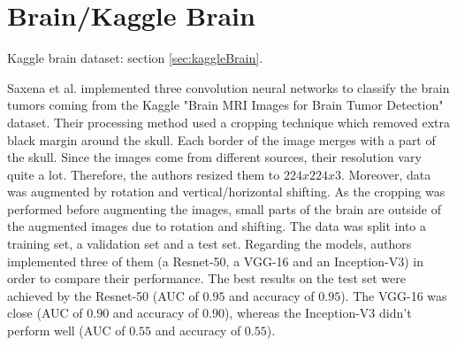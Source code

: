 \section{Brain/Kaggle Brain}
Kaggle brain dataset: section \ref{sec:kaggleBrain}.


Saxena et al. \cite{31} implemented three convolution neural networks to classify the brain tumors coming from the Kaggle "Brain MRI Images for Brain Tumor Detection" dataset. Their processing method used a cropping technique which removed extra black margin around the skull. Each border of the image merges with a part of the skull. Since the images come from different sources, their resolution vary quite a lot. Therefore, the authors resized them to $224x224x3$. Moreover, data was augmented by rotation and vertical/horizontal shifting. As the cropping was performed before augmenting the images, small parts of the brain are outside of the augmented images due to rotation and shifting. The data was split into a training set, a validation set and a test set. Regarding the models, authors implemented three of them (a Resnet-50, a VGG-16 and an Inception-V3) in order to compare their performance. The best results on the test set were achieved by the Resnet-50 (AUC of $0.95$ and accuracy of $0.95$). The VGG-16 was close (AUC of $0.90$ and accuracy of $0.90$), whereas the Inception-V3 didn't perform well (AUC of $0.55$ and accuracy of $0.55$).